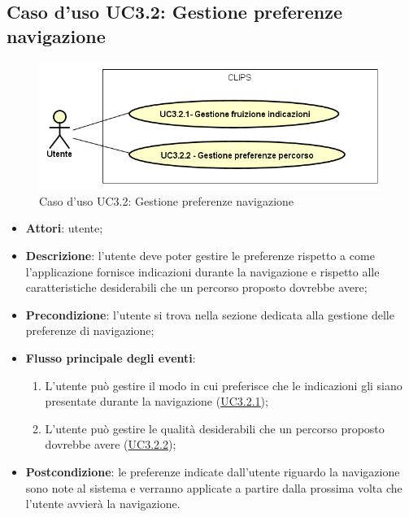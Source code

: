 \documentclass[../AnalisiDeiRequisiti.tex]{subfiles}
\begin{document}
\subsection{Caso d'uso UC3.2: Gestione preferenze navigazione}

        \begin{figure}[!h]
            \centering
            \includegraphics[scale=0.95, width=\textwidth]{img/UC3-2.png}
            \caption{Caso d'uso UC3.2: Gestione preferenze navigazione}\label{fig:UC3.2} 
        \end{figure}
\begin{itemize}
\item \textbf{Attori}: utente;
\item \textbf{Descrizione}: l'utente deve poter gestire le preferenze rispetto a come l'applicazione fornisce indicazioni durante la navigazione e rispetto alle caratteristiche desiderabili che un percorso proposto dovrebbe avere; 
      \item \textbf{Precondizione}: l'utente si trova nella sezione dedicata alla gestione delle preferenze di navigazione;

        \item \textbf{Flusso principale degli eventi}:
          \begin{enumerate}
          \item L'utente può gestire il modo in cui preferisce che le indicazioni gli siano presentate durante la navigazione (\hyperlink{UC3.2.1}{UC3.2.1});
          \item L'utente può gestire le qualità desiderabili che un percorso proposto dovrebbe avere (\hyperlink{UC3.2.2}{UC3.2.2});

      \end{enumerate}
    \item \textbf{Postcondizione}: le preferenze indicate dall'utente riguardo la navigazione sono note al sistema e verranno applicate a partire dalla prossima volta che l'utente avvierà la navigazione.
  \end{itemize}
\hypertarget{UC3.2.1}{}
\end{document}
